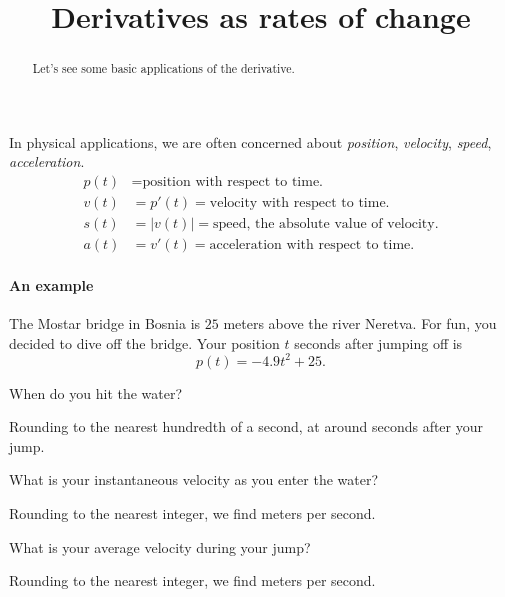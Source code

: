 \documentclass{ximera}
\title{Derivatives as rates of change}
\begin{document}
\begin{abstract}
  Let's see some basic applications of the derivative.
\end{abstract}
\maketitle

In physical applications, we are often concerned about
\textit{position}, \textit{velocity}, \textit{speed},
\textit{acceleration}.
\begin{align*}
p(t) &= \text{position with respect to time.}\\
v(t) &= p'(t) = \text{velocity with respect to time.}\\
s(t) &= |v(t)| = \text{speed, the absolute value of velocity.}\\
a(t) &=v'(t) = \text{acceleration with respect to time.}
\end{align*}

\paragraph{An example}


The Mostar bridge in Bosnia is $25$ meters above the river
Neretva. For fun, you decided to dive off the bridge. Your position
$t$ seconds after jumping off is
\[
p(t) = -4.9t^2 + 25.
\]

\begin{question}
  When do you hit the water? 
  \begin{prompt}
    Rounding to the nearest hundredth of a second, at around
     seconds after your jump.
  \end{prompt}
\end{question}

\begin{question}
  What is your instantaneous velocity as you enter the water?
  \begin{prompt}
    Rounding to the nearest integer, we find  meters per second. 
  \end{prompt}
\end{question}


\begin{question}
  What is your average velocity during your jump?
  \begin{prompt}
    Rounding to the nearest integer, we find  meters per second. 
  \end{prompt}
\end{question}
\end{document}
